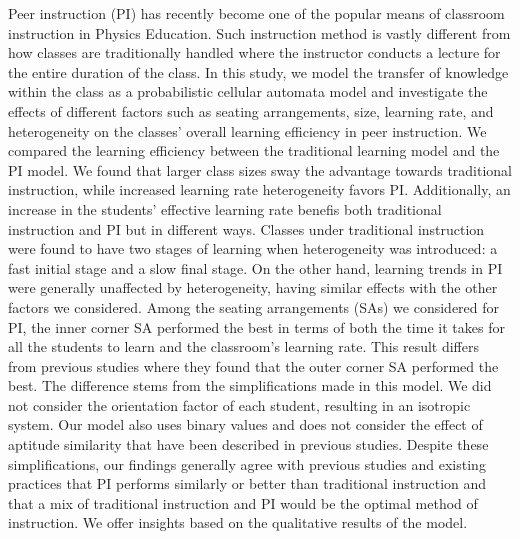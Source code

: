 Peer instruction (PI) has recently become one of the popular means of classroom instruction in Physics Education. 
Such instruction method is vastly different from how classes are traditionally handled where the instructor conducts a lecture for the entire duration of the class.
In this study, we model the transfer of knowledge within the class as a probabilistic cellular automata model and investigate the effects of different factors such as seating arrangements, size, learning rate, and heterogeneity on the classes' overall learning efficiency in peer instruction.
We compared the learning efficiency between the traditional learning model and the PI model. 
We found that larger class sizes sway the advantage towards traditional instruction, while increased learning rate heterogeneity favors PI.
Additionally, an increase in the students' effective learning rate benefis both traditional instruction and PI but in different ways.
Classes under traditional instruction were found to have two stages of learning when heterogeneity was introduced: a fast initial stage and a slow final stage.
On the other hand, learning trends in PI were generally unaffected by heterogeneity, having similar effects with the other factors we considered.
Among the seating arrangements (SAs) we considered for PI, the inner corner SA performed the best in terms of both the time it takes for all the students to learn and the classroom’s learning rate.
This result differs from previous studies where they found that the outer corner SA performed the best.
The difference stems from the simplifications made in this model.
We did not consider the orientation factor of each student, resulting in an isotropic system.
Our model also uses binary values and does not consider the effect of aptitude similarity that have been described in previous studies. 
Despite these simplifications, our findings generally agree with previous studies and existing practices that PI performs similarly or better than traditional instruction and that a mix of traditional instruction and PI would be the optimal method of instruction.
We offer insights based on the qualitative results of the model.

